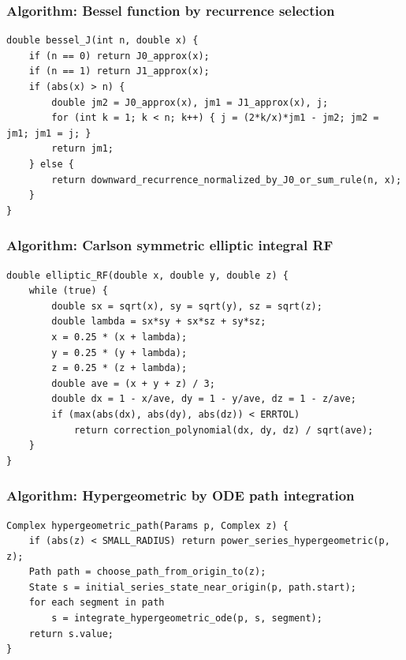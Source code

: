 \documentclass[11pt]{article}
\begin{document}
\subsubsection{Algorithm: Bessel function by recurrence selection}\label{algorithm-bessel-function-by-recurrence-selection}

\begin{verbatim}
double bessel_J(int n, double x) {
    if (n == 0) return J0_approx(x);
    if (n == 1) return J1_approx(x);
    if (abs(x) > n) {
        double jm2 = J0_approx(x), jm1 = J1_approx(x), j;
        for (int k = 1; k < n; k++) { j = (2*k/x)*jm1 - jm2; jm2 = jm1; jm1 = j; }
        return jm1;
    } else {
        return downward_recurrence_normalized_by_J0_or_sum_rule(n, x);
    }
}
\end{verbatim}

\subsubsection{Algorithm: Carlson symmetric elliptic integral RF}\label{algorithm-carlson-symmetric-elliptic-integral-rf}

\begin{verbatim}
double elliptic_RF(double x, double y, double z) {
    while (true) {
        double sx = sqrt(x), sy = sqrt(y), sz = sqrt(z);
        double lambda = sx*sy + sx*sz + sy*sz;
        x = 0.25 * (x + lambda);
        y = 0.25 * (y + lambda);
        z = 0.25 * (z + lambda);
        double ave = (x + y + z) / 3;
        double dx = 1 - x/ave, dy = 1 - y/ave, dz = 1 - z/ave;
        if (max(abs(dx), abs(dy), abs(dz)) < ERRTOL)
            return correction_polynomial(dx, dy, dz) / sqrt(ave);
    }
}
\end{verbatim}

\subsubsection{Algorithm: Hypergeometric by ODE path integration}\label{algorithm-hypergeometric-by-ode-path-integration}

\begin{verbatim}
Complex hypergeometric_path(Params p, Complex z) {
    if (abs(z) < SMALL_RADIUS) return power_series_hypergeometric(p, z);
    Path path = choose_path_from_origin_to(z);
    State s = initial_series_state_near_origin(p, path.start);
    for each segment in path
        s = integrate_hypergeometric_ode(p, s, segment);
    return s.value;
}
\end{verbatim}
\end{document}
